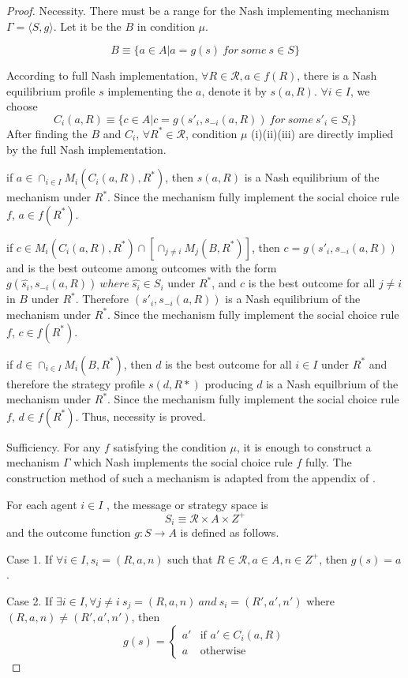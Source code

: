 \begin{proof}
Necessity.  There must be a range for the Nash implementing mechanism
$\Gamma = \langle S, g\rangle$. Let it be the $B$ in condition $\mu$.

\[ B\equiv \{a \in A|a=g(s)\ for\ some\ s \in S\}\]

 According to full Nash implementation, $\forall  R\in\mathscr{R}, a \in f(R)$, there is a Nash equilibrium profile $s$
 implementing the $a$, denote it by $s(a, R)$.  $\forall i \in I$,  we choose 
\[C_i(a,R)\equiv \{ c \in A | c = g(s'_i,s_{-i}(a,R))\  for\  some\  s'_i \in
  S_i\}\]
After finding the $B$ and $C_i$,  $\forall R^* \in \mathscr{R}$, condition $\mu$ (i)(ii)(iii)  are
directly implied by the full Nash implementation.

if $a \in \cap_{i \in I} M_i(C_i(a, R),R^*)$, then $s(a,R)$ is a Nash
equilibrium of the mechanism under $R^*$.  Since the mechanism fully
implement the social choice rule $f$, $a \in f(R^*)$.

if $c \in M_i(C_i(a, R), R^*) \cap [ \cap_{j \not = i} M_j(B, R^*)]$,
then $c = g(s'_i,s_{-i}(a,R))$ and is the best outcome among outcomes with the form
  $g(\hat{s_i},s_{-i}(a,R))\  where \  \hat{s_i} \in
  S_i$  under $R^*$, and $c$ is the best outcome for all $j \not = i$ in $B$ under
  $R^*$.  Therefore $(s'_i,s_{-i}(a,R))$  is a Nash
equilibrium of the mechanism under $R^*$.  Since the mechanism fully
implement the social choice rule $f$, $c \in f(R^*)$.

if $d \in \cap_{i\in I} M_i(B, R^*)$, then $d$ is the best outcome for
all $i \in I$ under $R^*$ and therefore the strategy profile $s(d,R*)$
producing $d$ is a Nash equilbrium of the mechanism under $R^*$. 
Since the mechanism fully
implement the social choice rule $f$, $d \in f(R^*)$. Thus, necessity
is  proved.

Sufficiency. For any  $f$ satisfying the condition $\mu$, it  is
enough to construct a mechanism $\Gamma$ which Nash
implements the social choice rule $f$  fully. The construction method of such
a mechanism is adapted
from the appendix of \parencite{Repullo90}. 

For each agent $i \in I$ , the message or strategy space is 
\[ S_i \equiv \mathscr{R} \times A \times Z^+ \]
and the outcome function $g: S \rightarrow A$ is defined as follows.

Case 1. If $\forall i \in I, s_i =  (R, a, n)$ such that $R \in
\mathscr{R}, a \in A, n \in Z^+$, then $g(s)=a$.

Case 2. If $\exists i \in I, \forall j \not = i \ s_j=(R, a, n) \  and
\ s_i = (R', a', n')$ where $ (R, a, n)  \not = (R', a', n')$, then 
$$g(s)= \begin{cases} 
 a'  & \text{if $a' \in C_i(a, R)$}\\ 
 a  & \text{otherwise} \end{cases}$$


\end{proof}
